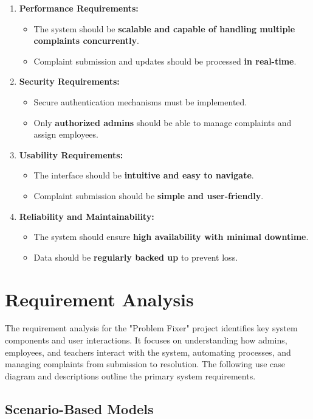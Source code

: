 \documentclass[a4paper,12pt]{article}
\begin{document}
\begin{enumerate}
\item \textbf{Performance Requirements:}
\begin{itemize}
\item The system should be \textbf{scalable and capable of handling multiple complaints concurrently}.
\item Complaint submission and updates should be processed \textbf{in real-time}.
\end{itemize}
\item \textbf{Security Requirements:}
\begin{itemize}
    \item Secure authentication mechanisms must be implemented.
    \item Only \textbf{authorized admins} should be able to manage complaints and assign employees.
\end{itemize}

\item \textbf{Usability Requirements:}
\begin{itemize}
    \item The interface should be \textbf{intuitive and easy to navigate}.
    \item Complaint submission should be \textbf{simple and user-friendly}.
\end{itemize}

\item \textbf{Reliability and Maintainability:}
\begin{itemize}
    \item The system should ensure \textbf{high availability with minimal downtime}.
    \item Data should be \textbf{regularly backed up} to prevent loss.
\end{itemize}
\end{enumerate}
\newpage
\section{Requirement Analysis}

The requirement analysis for the "Problem Fixer" project identifies key system components and user interactions. It focuses on understanding how admins, employees, and teachers interact with the system, automating processes, and managing complaints from submission to resolution. The following use case diagram and descriptions outline the primary system requirements.


\subsection{Scenario-Based Models}
\end{document}
